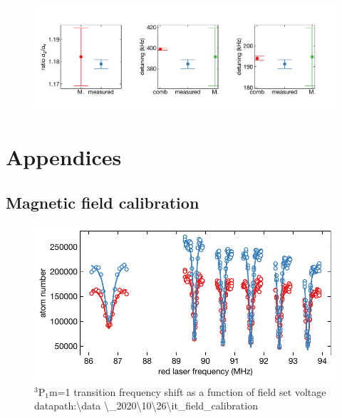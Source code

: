 \documentclass[bibnotes]{article}
\newcommand{\SLJ}[3]{{\ensuremath{{^{#1}}\mathrm{#2}_{#3}}}}
\newcommand{\TPO}{\SLJ{3}{P}{1}}
\begin{document}
		\begin{figure}
		    \hspace*{-0.5cm}
		    \includegraphics[scale=0.6]{figures/ratio_comparison_plot.pdf}
		    \caption{}
		    \label{fig:ratio_comparison_plot}
		\end{figure}


\section{Appendices}

\subsection{Magnetic field calibration}
		
		\begin{figure}[h]
		    \centering
		    \includegraphics[scale=0.8]{figures/field_calibration.pdf}
		    \caption{\TPO m=1 transition frequency shift as a function of field set voltage datapath:\textbackslash data \textbackslash\_2020\textbackslash10\textbackslash26\textbackslash it\_field\_calibration}
		    \label{fig:field_calibration}
		\end{figure}
\end{document}
